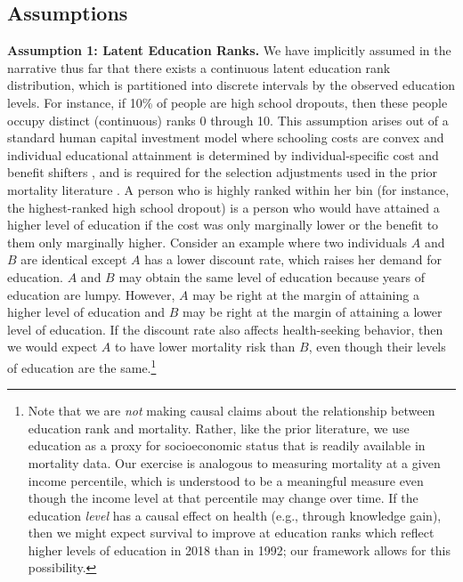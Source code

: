 \documentclass[12pt,letterpaper]{article}
\numberwithin{equation}{section}
\begin{document}
\subsection{Assumptions} 

\textbf{Assumption 1: Latent Education Ranks.} 
We have implicitly assumed in the narrative thus far that there exists
a continuous latent education rank distribution, which is partitioned
into discrete intervals by the observed education levels. For
instance, if 10\% of people are high school dropouts, then these
people occupy distinct (continuous) ranks 0 through 10. This
assumption arises out of a standard human capital investment model
where schooling costs are convex and individual educational attainment
is determined by individual-specific cost and benefit shifters
\citep{Card1999}, and is required for the selection adjustments used in the prior mortality literature \citep{Hendi2015,Cutler2011,Bound2015,Goldring2016}. A person who is highly ranked within her bin (for instance, the highest-ranked high school dropout) is a person who would have attained a higher level of education if the cost was only marginally lower or the benefit to them only marginally higher. Consider an example where two individuals $A$ and $B$ are identical except $A$ has a lower discount rate, which raises her demand for education. $A$ and $B$ may obtain the same level of education because years of education are lumpy. However, $A$ may be right at the margin of attaining a higher level of education and $B$ may be right at the margin of attaining a lower level of education. If the discount rate also affects health-seeking behavior, then we would expect $A$ to have lower mortality risk than $B$, even though their levels of education are the same.\footnote{Note that we are \textit{not} making causal claims about the relationship between education rank and mortality. Rather, like the prior literature, we use education as a proxy for socioeconomic status that is readily available in mortality data. Our exercise is analogous to measuring mortality at a given income percentile, which is understood to be a meaningful measure even though the income level at that percentile may change over time. If the education \textit{level} has a causal effect on health (e.g., through knowledge gain), then we might expect survival to improve at education ranks which reflect higher levels of education in 2018 than in 1992; our framework allows for this possibility.}
\end{document}
